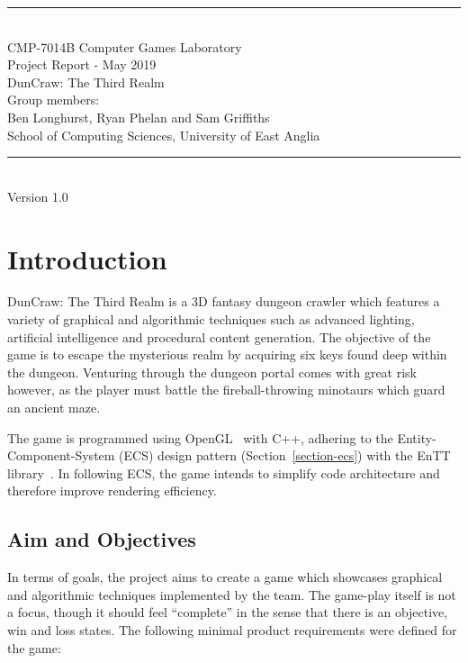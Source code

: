 \documentclass[a4paper, oneside, 11pt]{report}
\begin{document}
\begin{titlepage}
\begin{center}
\rule{12cm}{1mm} \\
\vspace{1cm}
{\large  CMP-7014B Computer Games Laboratory}
\vspace{7.5cm}
\\{\Large Project Report - May 2019}
\vspace{1.5cm}
\\{\LARGE DunCraw: The Third Realm}
\vspace{1.0cm}
\\{\Large Group members: \\ Ben Longhurst, Ryan Phelan and Sam Griffiths}
\vspace{10.0cm}
\\{\large School of Computing Sciences, University of East Anglia}
\\ \rule{12cm}{0.5mm}
\\ \hspace{8.5cm} {\large Version 1.0}
\end{center}
\end{titlepage}
\tableofcontents

\setcounter{page}{1}

\chapter{Introduction}
DunCraw: The Third Realm is a 3D fantasy dungeon crawler which features a variety of graphical and algorithmic techniques such as advanced lighting, artificial intelligence and procedural content generation. The objective of the game is to escape the mysterious realm by acquiring six keys found deep within the dungeon. Venturing through the dungeon portal comes with great risk however, as the player must battle the fireball-throwing minotaurs which guard an ancient maze.

The game is programmed using OpenGL~\cite{opengl} with C++, adhering to the Entity-Component-System (ECS) design pattern (Section~\ref{section-ecs}) with the EnTT library~\cite{entt}. In following ECS, the game intends to simplify code architecture and therefore improve rendering efficiency. 

\section{Aim and Objectives}\label{section-requirements}
In terms of goals, the project aims to create a game which showcases graphical and algorithmic techniques implemented by the team. The game-play itself is not a focus, though it should feel ``complete'' in the sense that there is an objective, win and loss states. The following minimal product requirements were defined for the game:
\end{document}
